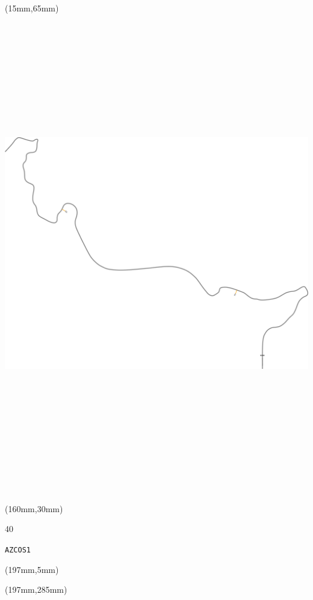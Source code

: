 \begin{textblock*}{185mm}(15mm,65mm)%
\centering
\mbox{\includegraphics[width=185mm,height=210mm,keepaspectratio]{PT/AZCOS1.pdf}}
\end{textblock*}
\begin{textblock*}{40mm}(160mm,30mm)%
\Large
\par{} 
\par40 
\par\hfill\tiny\tt AZCOS1\\
\end{textblock*}
\begin{textblock*}{20mm}(197mm,5mm)%
\fbox{\thepage}
\label{AZCOS1}
\end{textblock*}
\begin{textblock*}{20mm}(197mm,285mm)%
\fbox{\thepage}
\end{textblock*}

